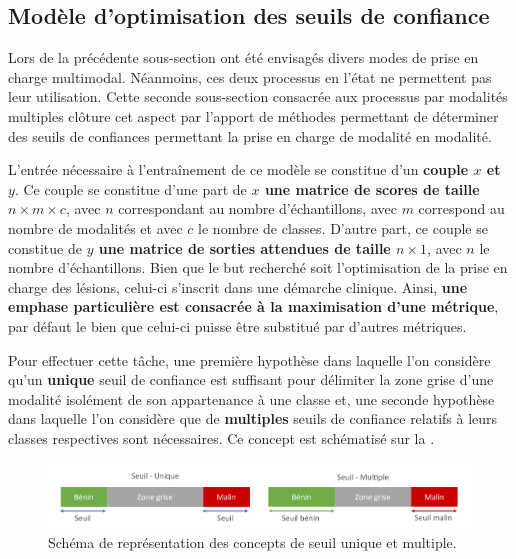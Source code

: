 \subsection{Modèle d'optimisation des seuils de confiance}
\label{sec:multimodal_confidence_model}
Lors de la précédente sous-section ont été envisagés divers modes de prise en charge multimodal. Néanmoins, ces deux processus en l'état ne permettent pas leur utilisation. Cette seconde sous-section consacrée aux processus par modalités multiples clôture cet aspect par l'apport de méthodes permettant de déterminer des seuils de confiances permettant la prise en charge de modalité en modalité.\par

L'entrée nécessaire à l'entraînement de ce modèle se constitue d'un \textbf{couple $x$ et $y$}. Ce couple se constitue d'une part de \textbf{$x$ une matrice de scores de taille $n \times m \times c$}, avec $n$ correspondant au nombre d'échantillons, avec $m$ correspond au nombre de modalités et avec $c$ le nombre de classes. D'autre part, ce couple se constitue de \textbf{$y$ une matrice de sorties attendues de taille $n \times 1$}, avec $n$ le nombre d'échantillons. Bien que le but recherché soit l'optimisation de la prise en charge des lésions, celui-ci s'inscrit dans une démarche clinique. Ainsi, \textbf{une emphase particulière est consacrée à la maximisation d'une métrique}, par défaut le \fscore{} bien que celui-ci puisse être substitué par d'autres métriques.\par

Pour effectuer cette tâche, une première hypothèse dans laquelle l'on considère qu'un \textbf{unique} seuil de confiance est suffisant pour délimiter la zone grise d'une modalité isolément de son appartenance à une classe et, une seconde hypothèse dans laquelle l'on considère que de \textbf{multiples} seuils de confiance relatifs à leurs classes respectives sont nécessaires. Ce concept est schématisé sur la .\par

\begin{figure}[H]
    \centering
    \includegraphics[width=\linewidth]{contents/chapter_8/resources/scheme_multimodal_treshold.pdf}
    \caption{Schéma de représentation des concepts de seuil unique et multiple.}
    \label{fig:scheme_multimodal_treshold}
\end{figure}\par

